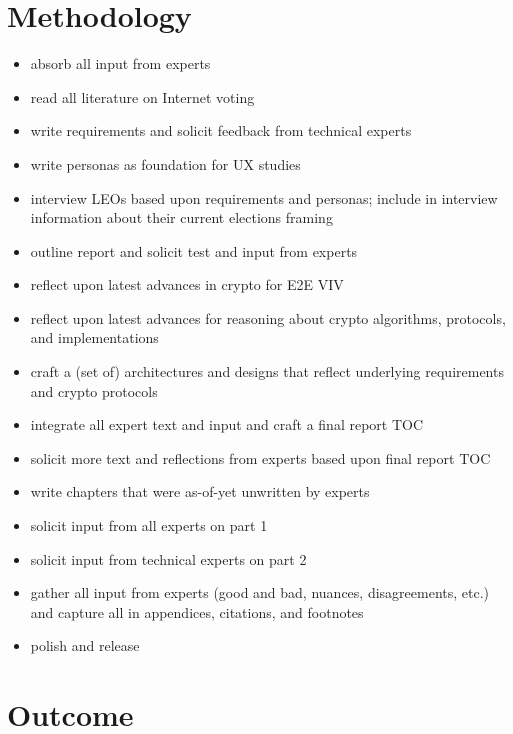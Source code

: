
\section{Methodology}


\begin{itemize}
\item absorb all input from experts
\item read all literature on Internet voting
\item write requirements and solicit feedback from technical experts
\item write personas as foundation for UX studies
\item interview LEOs based upon requirements and personas; include in
  interview information about their current elections framing
\item outline report and solicit test and input from experts
\item reflect upon latest advances in crypto for E2E VIV
\item reflect upon latest advances for reasoning about crypto
  algorithms, protocols, and implementations
\item craft a (set of) architectures and designs that reflect
  underlying requirements and crypto protocols
\item integrate all expert text and input and craft a final report TOC
\item solicit more text and reflections from experts based upon final
  report TOC
\item write chapters that were as-of-yet unwritten by experts
\item solicit input from all experts on part 1
\item solicit input from technical experts on part 2
\item gather all input from experts (good and bad, nuances,
  disagreements, etc.) and capture all in appendices, citations, and
  footnotes
\item polish and release
\end{itemize}

\section{Outcome}
\label{sec:outcome}

